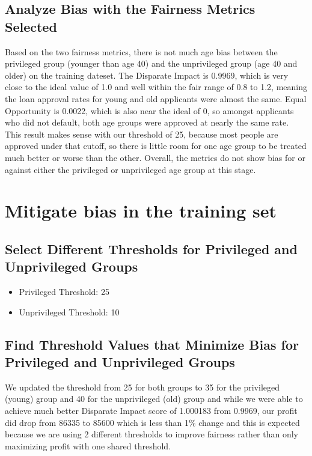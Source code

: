 \documentclass[
	letterpaper, %
]{jdf}
\begin{document}
\subsection{Analyze Bias with the Fairness Metrics Selected}
Based on the two fairness metrics, there is not much age bias between the privileged group (younger than age 40) and the unprivileged group (age 40 and older) on the training dateset. The Disparate Impact is 0.9969, which is very close to the ideal value of 1.0 and well within the fair range of 0.8 to 1.2, meaning the loan approval rates for young and old applicants were almost the same. Equal Opportunity is 0.0022, which is also near the ideal of 0, so amongst applicants who did not default, both age groups were approved at nearly the same rate. This result makes sense with our threshold of 25, because most people are approved under that cutoff, so there is little room for one age group to be treated much better or worse than the other. Overall, the metrics do not show bias for or against either the privileged or unprivileged age group at this stage.

\section{Mitigate bias in the training set }
\subsection{Select Different Thresholds for Privileged and Unprivileged Groups}
\begin{itemize}
    \item Privileged Threshold: 25
    \item Unprivileged Threshold: 10
\end{itemize}

\subsection{ Find Threshold Values that Minimize Bias for Privileged and Unprivileged Groups}
We updated the threshold from 25 for both groups to 35 for the privileged (young) group and 40 for the unprivileged (old) group and while we were able to achieve much better Disparate Impact score of 1.000183 from 0.9969, our profit did drop from 86335 to 85600 which is less than 1\% change and this is expected because we are using 2 different thresholds to improve fairness rather than only maximizing profit with one shared threshold.
\end{document}
